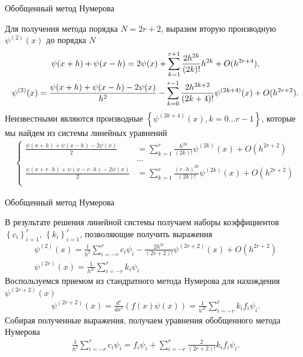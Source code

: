 \documentclass[10pt,pdf,hyperref={unicode},xcolor=dvipsnames]{beamer}
\newcommand{\lb}{\left(}
\newcommand{\rb}{\right)}
\newcommand{\lc}{\left\{}
\newcommand{\rc}{\right\}}
\newcommand{\psip}[1]{\psi^{(#1)}(x)}
\begin{document}
\begin{frame}{Обобщенный метод Нумерова}
    \begin{block}{}
        \vspace*{-0.5cm}
        Для получения метода порядка $N = 2r + 2$, выразим вторую производную $\psip{2}$ до порядка $N$ 
        \begin{gather}
            \psi(x+h) + \psi(x-h) = 2 \psi(x) + \sum_{k=1}^{r+1} \frac{ 2h^{2k} }{ (2k)! } h^{2k} + O(h^{2r+4}), \\
            \psip{2} = \frac{ \psi(x+h) + \psi(x-h) - 2\psi(x) }{ h^2 }  - \sum_{k=0}^{r-1} \frac{ 2h^{2k+2} }{ (2k+4)! } \psip{2k+4} + O(h^{2r+2}). \notag
        \end{gather}
        Неизвестными являются производные $\lc \psip{2k + 4}, k = 0 \dots r-1 \rc$, которые мы найдем из системы линейных уравнений
        \begin{gather}
            \lc
            \begin{aligned}
                \frac{ \psi(x+h) + \psi(x-h) - 2\psi(x) }{ 2 } &= \sum_{k=1}^{r} \frac{ h^{2k} }{ (2k)! } \psip{2k} + O(h^{2r+2}) \\ 
                                                               &\dots \\
                \frac{ \psi(x+r\cdot h) + \psi(x-r \cdot h) - 2\psi(x) }{ 2 } &= \sum_{k=1}^{r} \frac{ (r \cdot h)^{2k} }{ (2k)! } \psip{2k} + O(h^{2r+2}) \\ 
            \end{aligned}
            \right.
        \end{gather}
    \end{block}
\end{frame}

\begin{frame}{Обобщенный метод Нумерова}
    \begin{block}{}
        \vspace*{-0.5cm}
        В результате решения линейной системы получаем наборы коэффициентов $\lc c_i \rc_{i=1}^r$, $\lc k_i \rc_{i=1}^r$, позволяющие получить выражения
        \begin{gather}
            \psip{2} = \frac{1}{h^2} \sum_{i=-r}^r c_i \psi_i - \frac{2 h^{2r}}{(2r+2)!} \psip{2r+2} + O(h^{2r+2}) \\
            \psip{2r} = \frac{1}{h^{2r}} \sum_{i=-r}^r k_i \psi_i 
        \end{gather}
        Воспользуемся приемом из стандратного метода Нумерова для нахождения $\psip{2r+2}$
        \begin{gather}
            \psip{2r+2} = \frac{d^r}{dx^r} \lb f(x) \psi(x) \rb = \frac{1}{ h^{2r} } \sum_{i=-r}^r k_i f_i \psi_i.
        \end{gather}
        Собирая полученные выражения, получаем уравнения обобщенного метода Нумерова 
            \vspace*{-0.4cm}
        \begin{gather}
            \frac{1}{h^2} \sum_{i=-r}^r c_i \psi_i = f_i \psi_i + \sum_{i=-r}^r \frac{2}{(2r+2)!} k_i f_i \psi_i.
        \end{gather}
    \end{block}
\end{frame}
\end{document}
